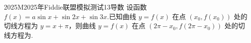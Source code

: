 
\begin{problem}{2025}{M}{2025年Fiddie联盟模拟测试}{13}{导数}
设函数 $ f(x)=a\sin x+\sin 2x+\sin 3x $.已知曲线 $ y=f(x) $ 在点 $ (x_0,f(x_0)) $ 处的切线方程为 $ y=x+\pi $，则曲线 $ y=f(x) $ 在点 $ (2\pi-x_0,f(2\pi-x_0)) $ 处的切线方程为\underline{\hspace{4em}}.
\end{problem}

\begin{answer}

\end{answer}

\begin{solutions}

\end{solutions}
